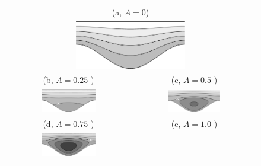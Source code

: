 \documentclass[lineno]{jfm}
\begin{document}
\begin{figure}
\centering
\def\wgh{0.45\textwidth}
\begin{tabular}{cc}
    \multicolumn{2}{c}{(a, $A=0$)} \\
    \multicolumn{2}{c}{\includegraphics[width=\wgh]{a000.png}} \\
    (b, $A=0.25$ ) & (c, $A=0.5$ ) \\
    \includegraphics[width=\wgh]{a025.png}
    &
    \includegraphics[width=\wgh]{a050.png} \\
    (d, $A=0.75$ ) & (e, $A=1.0$ ) \\
    \includegraphics[width=\wgh]{a075.png}

\end{tabular}
\end{figure}
\end{document}
